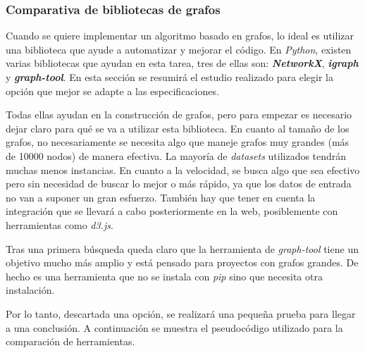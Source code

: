 \subsubsection{Comparativa de bibliotecas de grafos}
Cuando se quiere implementar un algoritmo basado en grafos, lo ideal es utilizar una biblioteca que ayude a automatizar y mejorar el código. En \textit{Python}, existen varias bibliotecas que ayudan en esta tarea, tres de ellas son: \textit{\textbf{NetworkX}}, \textit{\textbf{igraph}} y \textit{\textbf{graph-tool}}. En esta sección se resumirá el estudio realizado para elegir la opción que mejor se adapte a las especificaciones.

Todas ellas ayudan en la construcción de grafos, pero para empezar es necesario dejar claro para qué se va a utilizar esta biblioteca. En cuanto al tamaño de los grafos, no necesariamente se necesita algo que maneje grafos muy grandes (más de 10000 nodos) de manera efectiva. La mayoría de \textit{datasets} utilizados tendrán muchas menos instancias. En cuanto a la velocidad, se busca algo que sea efectivo pero sin necesidad de buscar lo mejor o más rápido, ya que los datos de entrada no van a suponer un gran esfuerzo. También hay que tener en cuenta la integración que se llevará a cabo posteriormente en la web, posiblemente con herramientas como \textit{d3.js}.

Tras una primera búsqueda queda claro que la herramienta de \textit{graph-tool} tiene un objetivo mucho más amplio y está pensado para proyectos con grafos grandes. De hecho es una herramienta que no se instala con \textit{pip} sino que necesita otra instalación.

Por lo tanto, descartada una opción, se realizará una pequeña prueba para llegar a una conclusión. A continuación se muestra el pseudocódigo utilizado para la comparación de herramientas.

